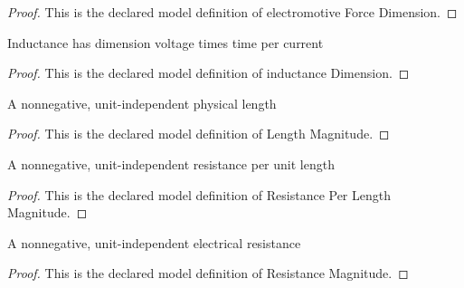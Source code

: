 \begin{proof}
  This is the declared model definition of electromotive Force Dimension.
\end{proof}
\begin{definition}
  \label{def:physics:phyx-mini-0978:phyxminiproblems-problemphyxmini0978-inductancedimension}
  Inductance has dimension voltage times time per current
\end{definition}
\begin{proof}
  This is the declared model definition of inductance Dimension.
\end{proof}
\begin{definition}
  \label{def:physics:phyx-mini-0978:phyxminiproblems-problemphyxmini0978-lengthmagnitude}
  A nonnegative, unit-independent physical length
\end{definition}
\begin{proof}
  This is the declared model definition of Length Magnitude.
\end{proof}
\begin{definition}
  \label{def:physics:phyx-mini-0978:phyxminiproblems-problemphyxmini0978-resistanceperlengthmagnitude}
  A nonnegative, unit-independent resistance per unit length
\end{definition}
\begin{proof}
  This is the declared model definition of Resistance Per Length Magnitude.
\end{proof}
\begin{definition}
  \label{def:physics:phyx-mini-0978:phyxminiproblems-problemphyxmini0978-resistancemagnitude}
  A nonnegative, unit-independent electrical resistance
\end{definition}
\begin{proof}
  This is the declared model definition of Resistance Magnitude.
\end{proof}
